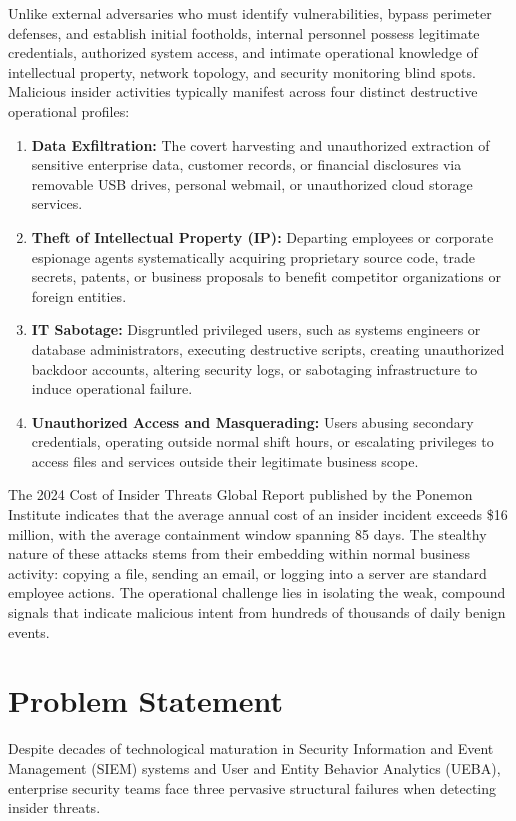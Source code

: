 \documentclass[12pt,a4paper]{report}
\begin{document}
Unlike external adversaries who must identify vulnerabilities, bypass perimeter defenses, and establish initial footholds, internal personnel possess legitimate credentials, authorized system access, and intimate operational knowledge of intellectual property, network topology, and security monitoring blind spots. Malicious insider activities typically manifest across four distinct destructive operational profiles:
\begin{enumerate}
    \item \textbf{Data Exfiltration:} The covert harvesting and unauthorized extraction of sensitive enterprise data, customer records, or financial disclosures via removable USB drives, personal webmail, or unauthorized cloud storage services.
    \item \textbf{Theft of Intellectual Property (IP):} Departing employees or corporate espionage agents systematically acquiring proprietary source code, trade secrets, patents, or business proposals to benefit competitor organizations or foreign entities.
    \item \textbf{IT Sabotage:} Disgruntled privileged users, such as systems engineers or database administrators, executing destructive scripts, creating unauthorized backdoor accounts, altering security logs, or sabotaging infrastructure to induce operational failure.
    \item \textbf{Unauthorized Access and Masquerading:} Users abusing secondary credentials, operating outside normal shift hours, or escalating privileges to access files and services outside their legitimate business scope.
\end{enumerate}

The 2024 Cost of Insider Threats Global Report published by the Ponemon Institute indicates that the average annual cost of an insider incident exceeds \$16 million, with the average containment window spanning 85 days. The stealthy nature of these attacks stems from their embedding within normal business activity: copying a file, sending an email, or logging into a server are standard employee actions. The operational challenge lies in isolating the weak, compound signals that indicate malicious intent from hundreds of thousands of daily benign events.

\section{Problem Statement}
Despite decades of technological maturation in Security Information and Event Management (SIEM) systems and User and Entity Behavior Analytics (UEBA), enterprise security teams face three pervasive structural failures when detecting insider threats.
\end{document}
